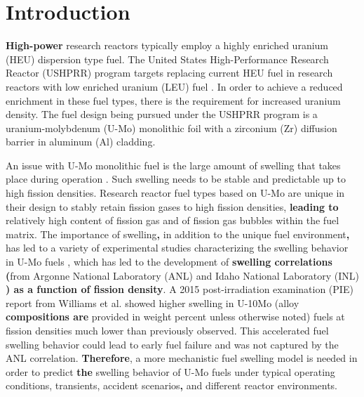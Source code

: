 \documentclass[review]{elsarticle}
\providecommand{\DIFaddtex}[1]{{\bf #1}} %
\providecommand{\DIFdeltex}[1]{} %
\providecommand{\DIFaddbegin}{\protect\color{blue}} %
\providecommand{\DIFaddend}{\protect\color{black}} %
\providecommand{\DIFdelbegin}{\protect\color{red}} %
\providecommand{\DIFdelend}{\protect\color{black}} %
\providecommand{\DIFadd}[1]{\texorpdfstring{\DIFaddtex{#1}}{#1}} %
\providecommand{\DIFdel}[1]{\texorpdfstring{\DIFdeltex{#1}}{}} %
\newcommand{\DIFscaledelfig}{0.5}
\newlength{\DIFdelgraphicswidth} %
\newlength{\DIFdelgraphicsheight} %
\newcommand{\DIFaddincludegraphics}[2][]{{\color{blue}\fbox{\DIFOincludegraphics[#1]{#2}}}} %
\newcommand{\DIFdelincludegraphics}[2][]{%
\sbox{\DIFdelgraphicsbox}{\DIFOincludegraphics[#1]{#2}}%
\settoboxwidth{\DIFdelgraphicswidth}{\DIFdelgraphicsbox} %
\settoboxtotalheight{\DIFdelgraphicsheight}{\DIFdelgraphicsbox} %
\scalebox{\DIFscaledelfig}{%
\parbox[b]{\DIFdelgraphicswidth}{\usebox{\DIFdelgraphicsbox}\\[-\baselineskip] \rule{\DIFdelgraphicswidth}{0em}}\llap{\resizebox{\DIFdelgraphicswidth}{\DIFdelgraphicsheight}{%
\setlength{\unitlength}{\DIFdelgraphicswidth}%
\begin{picture}(1,1)%
\thicklines\linethickness{2pt} %
{\color[rgb]{1,0,0}\put(0,0){\framebox(1,1){}}}%
{\color[rgb]{1,0,0}\put(0,0){\line( 1,1){1}}}%
{\color[rgb]{1,0,0}\put(0,1){\line(1,-1){1}}}%
\end{picture}%
}\hspace*{3pt}}} %
} %
\DeclareRobustCommand{\DIFaddbegin}{\DIFOaddbegin \let\includegraphics\DIFaddincludegraphics} %
\DeclareRobustCommand{\DIFaddend}{\DIFOaddend \let\includegraphics\DIFOincludegraphics} %
\DeclareRobustCommand{\DIFdelbegin}{\DIFOdelbegin \let\includegraphics\DIFdelincludegraphics} %
\DeclareRobustCommand{\DIFdelend}{\DIFOaddend \let\includegraphics\DIFOincludegraphics} %
\begin{document}
\section{Introduction}

\DIFdelbegin \DIFdel{High power }\DIFdelend \DIFaddbegin \DIFadd{High-power }\DIFaddend research reactors typically employ a highly enriched uranium (HEU) dispersion type fuel. The United States High-Performance Research Reactor (USHPRR) program targets replacing current HEU fuel in research reactors with low enriched uranium (LEU) fuel \cite{snelgrove1997}. In order to achieve a reduced enrichment in these fuel types, there is the requirement for increased uranium density. The fuel design being pursued under the USHPRR program is a uranium-molybdenum (U-Mo) monolithic foil \DIFdelbegin \DIFdel{, }\DIFdelend with a zirconium (Zr) diffusion barrier in aluminum (Al) cladding.

An issue with U-Mo monolithic fuel is the large amount of swelling that takes place during operation \cite{hofman1997}. Such swelling needs to be stable and predictable up to high fission densities. Research reactor fuel types based on U-Mo are unique in their design to stably retain fission gases to high fission densities, \DIFdelbegin \DIFdel{and as such there is a }\DIFdelend \DIFaddbegin \DIFadd{leading to }\DIFaddend relatively high content of fission gas and of fission gas bubbles within the fuel matrix. The importance of swelling\DIFaddbegin \DIFadd{, }\DIFaddend in addition to the unique fuel environment\DIFaddbegin \DIFadd{, }\DIFaddend has led to a variety of experimental studies characterizing the swelling behavior in U-Mo fuels \cite{rest2009, kim_anl08, meyer2002, kim2013}, which has led to the development of \DIFdelbegin \DIFdel{a swelling correlation as a function of fission density }\DIFdelend \DIFaddbegin \DIFadd{swelling correlations (}\DIFaddend from Argonne National Laboratory (ANL) \cite{kim2011} and Idaho National Laboratory (INL) \cite{umo_prelim_report2017}\DIFaddbegin \DIFadd{) as a function of fission density}\DIFaddend . A 2015 post-irradiation examination (PIE) report \cite{afip6report} from Williams \DIFdelbegin \DIFdel{, }\DIFdelend et al. showed higher swelling in U-10Mo (alloy \DIFdelbegin \DIFdel{composition is }\DIFdelend \DIFaddbegin \DIFadd{compositions are }\DIFaddend provided in weight percent unless otherwise noted) fuels at fission densities much lower than previously observed. This accelerated fuel swelling behavior could lead to early fuel failure and was not captured by the ANL correlation. \DIFdelbegin \DIFdel{As such}\DIFdelend \DIFaddbegin \DIFadd{Therefore}\DIFaddend , a more mechanistic fuel swelling model is needed in order to predict \DIFaddbegin \DIFadd{the }\DIFaddend swelling behavior of U-Mo fuels under \DIFdelbegin \DIFdel{both }\DIFdelend typical operating conditions, \DIFdelbegin \DIFdel{as well as }\DIFdelend transients, accident scenarios\DIFaddbegin \DIFadd{, }\DIFaddend and different reactor environments.
\end{document}
